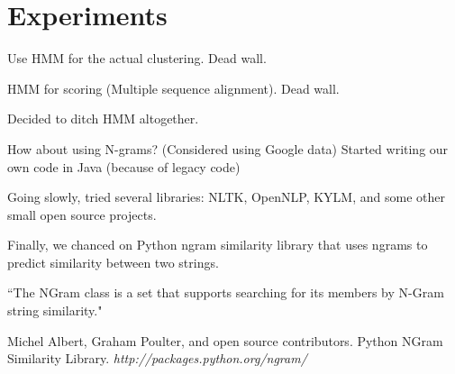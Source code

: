 \documentclass{article}
\begin{document}
\section{Experiments}

Use HMM for the actual clustering. Dead wall.

HMM for scoring (Multiple sequence alignment). Dead wall.

Decided to ditch HMM altogether.

How about using N-grams? (Considered using Google data)
Started writing our own code in Java (because of legacy code)

Going slowly, tried several libraries: NLTK, OpenNLP, KYLM, and some other small open source projects.

Finally, we chanced on Python ngram similarity library that uses ngrams to predict similarity between two strings. 

``The NGram class is a set that supports searching for its members by N-Gram string similarity." \cite{py_ngram_lib}


\begin{thebibliography}{1}

Michel Albert, Graham Poulter, and open source contributors. Python NGram Similarity Library. \textit{http://packages.python.org/ngram/}
\end{thebibliography}
\end{document}
